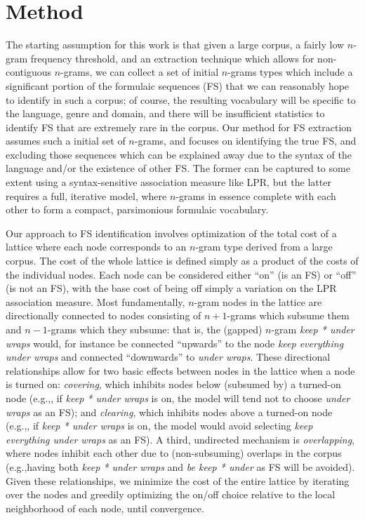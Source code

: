 \documentclass[11pt]{article}
\makeatletter
\def \eg {e.g.,\@ }
\makeatother
\begin{document}
\section{Method}

The starting assumption for this work is that given a large corpus, a fairly low $n$-gram frequency threshold, and an extraction technique which allows for non-contiguous $n$-grams, we can collect a set of initial $n$-grams types which include a significant portion of the formulaic sequences (FS) that we can reasonably hope to identify in such a corpus; of course, the resulting vocabulary will be specific to the language, genre and domain, and there will be insufficient statistics to identify FS that are extremely rare in the corpus. Our method for FS extraction assumes such a initial set of $n$-grams, and focuses on identifying the true FS, and excluding those sequences which can be explained away due to the syntax of the language and/or the existence of other FS. The former can be captured to some extent using a syntax-sensitive association measure like LPR, but the latter requires a full, iterative model, where $n$-grams in essence complete with each other to form a compact, parsimonious formulaic vocabulary.

Our approach to FS identification involves optimization of the total cost of a lattice where each node corresponds to an $n$-gram type derived from a large corpus. The cost of the whole lattice is defined simply as a product of the costs of the individual nodes. Each node can be considered either ``on'' (is an FS) or ``off'' (is not an FS), with the base cost of being off simply a variation on the LPR association measure. Most fundamentally, $n$-gram nodes in the lattice are directionally connected to nodes consisting of $n+1$-grams which subsume them and $n-1$-grams which they subsume: that is, the (gapped) $n$-gram \emph{keep * under wraps} would, for instance be connected ``upwards'' to the node \emph{keep everything under wraps} and connected ``downwards'' to \emph{under wraps}. These directional relationships allow for two basic effects between nodes in the lattice when a node is turned on: \emph{covering}, which inhibits nodes below (subsumed by) a turned-on node (\eg, if \emph{keep * under wraps} is on, the model will tend not to choose \emph{under wraps} as an FS); and \emph{clearing}, which inhibits nodes above a turned-on node (\eg, if \emph{keep * under wraps} is on, the model would avoid selecting \emph{keep everything under wraps} as an FS). A third, undirected mechanism is \emph{overlapping}, where nodes inhibit each other due to (non-subsuming) overlaps in the corpus (\eg having both \emph{keep * under wraps} and \emph{be keep * under} as FS will be avoided). Given these relationships, we minimize the cost of the entire lattice by iterating over the nodes and greedily optimizing the on/off choice relative to the local neighborhood of each node, until convergence.
\end{document}
